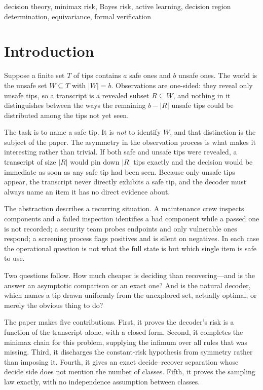 \begin{IEEEkeywords}
decision theory, minimax risk, Bayes risk, active learning, decision region determination,
equivariance, formal verification
\end{IEEEkeywords}

\section{Introduction}

Suppose a finite set $T$ of tips contains $a$ safe ones and $b$ unsafe ones. The world is the
unsafe set $W\subseteq T$ with $|W|=b$. Observations are one-sided: they reveal only unsafe
tips, so a transcript is a revealed subset $R\subseteq W$, and nothing in it distinguishes
between the ways the remaining $b-|R|$ unsafe tips could be distributed among the tips not yet
seen.

The task is to name a safe tip. It is \emph{not} to identify $W$, and that distinction is the
subject of the paper. The asymmetry in the observation process is what makes it interesting
rather than trivial. If both safe and unsafe tips were revealed, a transcript of size $|R|$
would pin down $|R|$ tips exactly and the decision would be immediate as soon as any safe tip
had been seen. Because only unsafe tips appear, the transcript never directly exhibits a safe
tip, and the decoder must always name an item it has no direct evidence about.

The abstraction describes a recurring situation. A maintenance crew inspects components and a
failed inspection identifies a bad component while a passed one is not recorded; a security
team probes endpoints and only vulnerable ones respond; a screening process flags positives
and is silent on negatives. In each case the operational question is not what the full state
is but which single item is safe to use.

Two questions follow. How much cheaper is deciding than recovering---and is the answer an
asymptotic comparison or an exact one? And is the natural decoder, which names a tip drawn
uniformly from the unexplored set, actually optimal, or merely the obvious thing to do?

The paper makes five contributions. First, it proves the decoder's risk is a function of the
transcript alone, with a closed form. Second, it completes the minimax chain for this problem,
supplying the infimum over all rules that was missing. Third, it discharges the constant-risk
hypothesis from symmetry rather than imposing it. Fourth, it gives an exact decide--recover
separation whose decide side does not mention the number of classes. Fifth, it proves the
sampling law exactly, with no independence assumption between classes.


